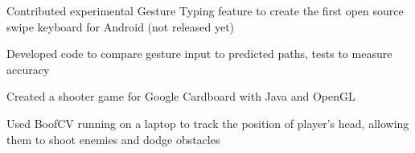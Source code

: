 \documentclass[]{deedy-resume-openfont}
\begin{document}
\begin{minipage}[t]{0.67\textwidth}
\begin{tightemize}
\item Contributed experimental Gesture Typing feature to create the first open source swipe keyboard for Android (not released yet)
\item Developed code to compare gesture input to predicted paths, tests to measure accuracy
\end{tightemize}
\sectionsep

\begin{tightemize}
\item Created a shooter game for Google Cardboard with Java and OpenGL 
\item Used BoofCV running on a laptop to track the position of player’s head, allowing them to shoot enemies and dodge obstacles
\end{tightemize}
\sectionsep

\end{minipage} 
\end{document}
